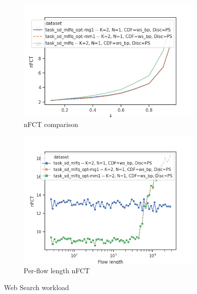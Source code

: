 \begin{figure}
	\centering
	\begin{subfigure}{.5\textwidth}
		\centering
		\includegraphics[width=1.05\textwidth]{Chapter3/Figures/ws_ps_comparison}
		\caption{nFCT comparison}
		\label{fig:optlbgain-ws}
	\end{subfigure}%
	\begin{subfigure}{.5\textwidth}
		\centering
		\includegraphics[width=\textwidth]{Chapter3/Figures/ws_ps_detailed.png}
		\caption{Per-flow length nFCT}
		\label{fig:optlbgainvsflowsize-ws}
	\end{subfigure}
	\caption{Web Search workload}
	\label{fig:optlb-ws}
\end{figure}
